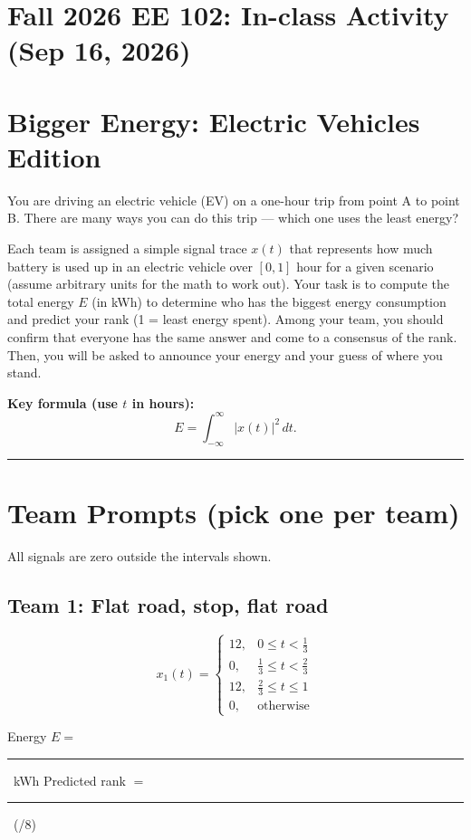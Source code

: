 \documentclass[11pt]{article}
\newcommand{\Eblank}{\rule{3cm}{0.4pt}}
\newcommand{\Rankblank}{\rule{3cm}{0.4pt}}
\begin{document}
\section*{Fall 2026 EE 102: In-class Activity (Sep 16, 2026)}

\section*{Bigger Energy: Electric Vehicles Edition}
You are driving an electric vehicle (EV) on a one-hour trip from point A to point B. There are many ways you can do this trip --- which one uses the least energy?
\medskip

\noindent Each team is assigned a simple signal trace \(x(t)\)  that represents how much battery is used up in an electric vehicle over \([0,1]\) hour for a given scenario (assume arbitrary units for the math to work out). Your task is to compute the total energy \(E\) (in \si{kWh}) to determine who has the biggest energy consumption and predict your rank (1 = least energy spent). Among your team, you should confirm that everyone has the same answer and come to a consensus of the rank. Then, you will be asked to announce your energy and your guess of where you stand.

\medskip

\textbf{Key formula (use \(t\) in hours):}
\[
E  = \int_{-\infty}^{\infty} |x(t)|^2 \,dt.
\]

\bigskip
\hrule
\bigskip

\section*{Team Prompts (pick one per team)}
All signals are zero outside the intervals shown.

\subsection*{Team 1: Flat road, stop, flat road}
\[
x_1(t)=
\begin{cases}
12, & 0 \le t < \tfrac{1}{3} \\
0, & \tfrac{1}{3} \le t < \tfrac{2}{3} \\
12, & \tfrac{2}{3} \le t \le 1 \\
0, & \text{otherwise}
\end{cases}
\]
\begin{tcolorbox}[title=Team 1: Record your results]
Energy \(E=\) \Eblank\ \si{kWh} \quad\quad Predicted rank \(=\) \Rankblank\ (/8)
\end{tcolorbox}
\end{document}
